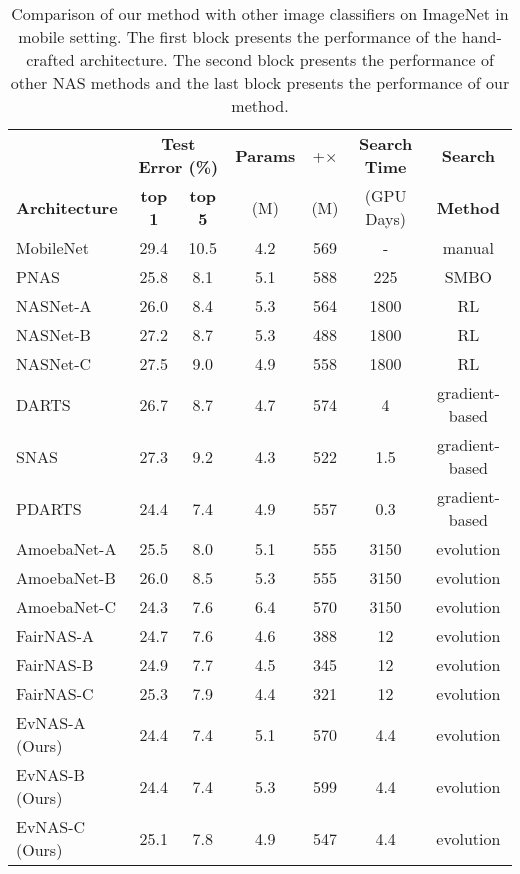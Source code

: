 \documentclass[final]{cvpr}
\begin{document}
\begin{table*}[t]
    \caption{Comparison of our method with other image classifiers on ImageNet in mobile setting.
    The first block presents the performance of the hand-crafted architecture. The second block
    presents the performance of other NAS methods and the last block presents the performance of our
    method.}
    \label{table:imagenet}
    \centering
    \begin{tabular}{lcccccc}
\hline
     &  \multicolumn{2}{c}{\bf{Test Error (\%)}} & \bf{Params} &+$\times$& \bf{Search Time} &\bf{Search} \\
    \bf{Architecture} & \bf{top 1} & \bf{top 5} & (M) & (M) & (GPU Days) & \bf{Method} \\
\hline
MobileNet            \cite{howard2017mobilenets}&29.4& 10.5    & 4.2 & 569 & - & manual\\ 
    \hline
    PNAS            \cite{liu2018progressive}  &25.8& 8.1    & 5.1 & 588 & 225 & SMBO\\
    NASNet-A             \cite{zoph2018learning}    & 26.0 & 8.4      & 5.3 & 564 &1800& RL\\
    NASNet-B             \cite{zoph2018learning}    & 27.2  & 8.7     & 5.3 & 488 &1800& RL\\
    NASNet-C             \cite{zoph2018learning}    & 27.5  & 9.0     & 4.9 & 558 &1800& RL\\
    
    DARTS  \cite{liu2018darts2}       & 26.7  & 8.7 & 4.7 & 574 &4& gradient-based\\
    SNAS                 \cite{xie2018snas}         & 27.3  & 9.2 & 4.3 & 522 &1.5& gradient-based\\
    PDARTS               \cite{chen2019progressive} & 24.4  & 7.4 & 4.9 & 557 &0.3& gradient-based\\
    
    AmoebaNet-A          \cite{real2019regularized} & 25.5 & 8.0 & 5.1 & 555 &3150& evolution\\
    AmoebaNet-B          \cite{real2019regularized} & 26.0 & 8.5 & 5.3 & 555 &3150& evolution\\
    AmoebaNet-C          \cite{real2019regularized} & 24.3 & 7.6 & 6.4 & 570 &3150& evolution\\
    FairNAS-A          \cite{chu2019fairnas} & 24.7 & 7.6 & 4.6 & 388 &12& evolution\\
    FairNAS-B          \cite{chu2019fairnas} & 24.9 & 7.7 & 4.5 & 345 &12& evolution\\
    FairNAS-C          \cite{chu2019fairnas} & 25.3 & 7.9 & 4.4 & 321 &12& evolution\\
    \hline
    EvNAS-A (Ours)                                     & 24.4 & 7.4 & 5.1 & 570 & 4.4 & evolution\\
    EvNAS-B (Ours)                                     & 24.4 & 7.4 & 5.3 & 599 & 4.4 & evolution\\
    EvNAS-C (Ours)                                     & 25.1 & 7.8 & 4.9 & 547 & 4.4 & evolution\\
    
    \end{tabular}
\end{table*}
\end{document}
